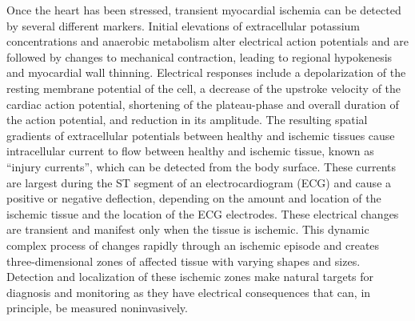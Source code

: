 Once the heart has been stressed, transient myocardial ischemia can be detected by several different markers. Initial elevations of extracellular potassium concentrations and anaerobic metabolism alter electrical action potentials and are followed by changes to mechanical contraction, leading to regional hypokenesis and myocardial wall thinning.\cite{BLZ:Mai1994,RSM:Rei86b} Electrical responses include a depolarization of the resting membrane potential of the cell, a decrease of the upstroke velocity of the cardiac action potential, shortening of the plateau-phase and overall duration of the action potential, and reduction in its amplitude. \cite{BLZ:Yan1996,BMB:Kat2011} The resulting spatial gradients of extracellular potentials between healthy and ischemic tissues cause intracellular current to flow between healthy and ischemic tissue, known as ``injury currents'', which can be detected from the body surface.\cite{KKA:Sha97a,KKA:Sha97b,RSM:Bra76,RSM:Bra88} These currents are largest during the ST segment of an electrocardiogram (ECG) and cause a positive or negative deflection, depending on the amount and location of the ischemic tissue and the location of the ECG electrodes. \cite{BLZ:Jan1980,BLZ:Jan1981} These electrical changes are transient and manifest only when the tissue is ischemic. This dynamic complex process of changes rapidly through an ischemic episode and creates three-dimensional zones of affected tissue with varying shapes and sizes.  Detection and localization of these ischemic zones make natural targets for diagnosis and monitoring as they have electrical consequences that can, in principle, be measured noninvasively. 

